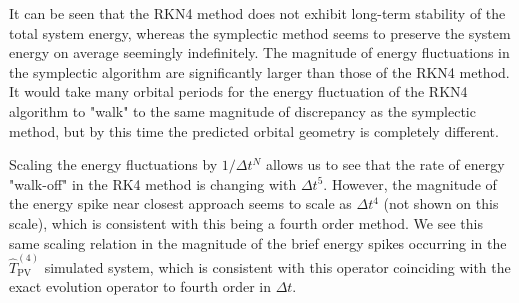 \documentclass[8pt,a4paper]{article}
\begin{document}
	It can be seen that the RKN4 method does not exhibit long-term stability of the total system energy, whereas the symplectic method seems to preserve the system energy on average seemingly indefinitely. The magnitude of energy fluctuations in the symplectic algorithm are significantly larger than those of the RKN4 method. It would take many orbital periods for the energy fluctuation of the RKN4 algorithm to "walk" to the same magnitude of discrepancy as the symplectic method, but by this time the predicted orbital geometry is completely different.
	
	Scaling the energy fluctuations by $1/\Delta t^N$ allows us to see that the rate of energy "walk-off" in the RK4 method is changing with $\Delta t^5$. However, the magnitude of the energy spike near closest approach seems to scale as $\Delta t^4$ (not shown on this scale), which is consistent with this being a fourth order method. We see this same scaling relation in the magnitude of the brief energy spikes occurring in the $\hat{T}^{(4)}_\mathrm{PV}$ simulated system, which is consistent with this operator coinciding with the exact evolution operator to fourth order in $\Delta t$.
	
\end{document}
